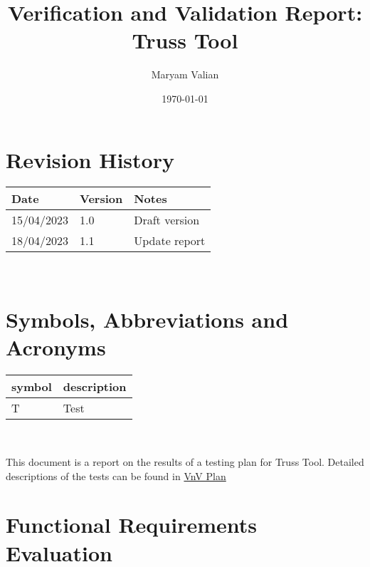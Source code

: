 \documentclass[12pt, titlepage]{article}
\begin{document}
\title{Verification and Validation Report: Truss Tool} 
\author{Maryam Valian}
\date{\today}
	
\maketitle


\section{Revision History}

\begin{tabularx}{\textwidth}{p{3cm}p{2cm}X}
\toprule {\bf Date} & {\bf Version} & {\bf Notes}\\
\midrule
15/04/2023 & 1.0 & Draft version\\
18/04/2023 & 1.1 & Update report\\
\bottomrule
\end{tabularx}

~\newpage

\section{Symbols, Abbreviations and Acronyms}

\renewcommand{\arraystretch}{1.2}
\begin{tabular}{l l} 
  \toprule		
  \textbf{symbol} & \textbf{description}\\
  \midrule 
  T & Test\\
  \bottomrule
\end{tabular}\\


\newpage

\tableofcontents

\listoftables %

\listoffigures %

\newpage


This document is a report on the results of a testing plan for Truss Tool.
Detailed descriptions of the tests can be found in \href{https://github.com/Maryamvalian/project741/blob/cfe06182f41c842e3b44aa0eb33d661cf8a3ce79/docs/VnVPlan/VnVPlan.pdf}{VnV Plan}

\section{Functional Requirements Evaluation}
\end{document}
